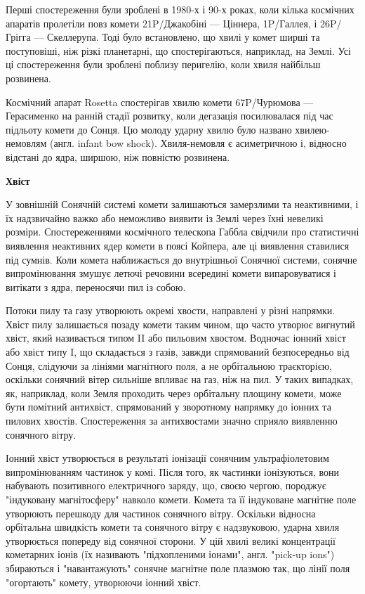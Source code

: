 \documentclass[a4paper]{article}
\begin{document}
    Перші спостереження були зроблені в 1980-х і 90-х роках, коли кілька космічних апаратів пролетіли повз комети 21P/Джакобіні --- Ціннера, 1P/Галлея, і 26P/Грігга --- Скеллерупа. Тоді було встановлено, що хвилі у комет ширші та поступовіші, ніж різкі планетарні, що спостерігаються, наприклад, на Землі. Усі ці спостереження були зроблені поблизу перигелію, коли хвиля найбільш розвинена.
    
    Космічний апарат Rosetta спостерігав хвилю комети 67P/Чурюмова --- Герасименко на ранній стадії розвитку, коли дегазація посилювалася під час підльоту комети до Сонця. Цю молоду ударну хвилю було названо хвилею-немовлям (англ. infant bow shock). Хвиля-немовля є асиметричною і, відносно відстані до ядра, ширшою, ніж повністю розвинена.
    
    \textbf{Хвіст}
    
    У зовнішній Сонячній системі комети залишаються замерзлими та неактивними, і їх надзвичайно важко або неможливо виявити із Землі через їхні невеликі розміри. Спостереженнями космічного телескопа Габбла свідчили про статистичні виявлення неактивних ядер комети в поясі Койпера, але ці виявлення ставилися під сумнів. Коли комета наближається до внутрішньої Сонячної системи, сонячне випромінювання змушує летючі речовини всередині комети випаровуватися і витікати з ядра, переносячи пил із собою.
    
    Потоки пилу та газу утворюють окремі хвости, направлені у різні напрямки. Хвіст пилу залишається позаду комети таким чином, що часто утворює вигнутий хвіст, який називається типом II або пильовим хвостом. Водночас іонний хвіст або хвіст типу I, що складається з газів, завжди спрямований безпосередньо від Сонця, слідуючи за лініями магнітного поля, а не орбітальною траєкторією, оскільки сонячний вітер сильніше впливає на газ, ніж на пил. У таких випадках, як, наприклад, коли Земля проходить через орбітальну площину комети, може бути помітний антихвіст, спрямований у зворотному напрямку до іонних та пилових хвостів. Спостереження за антихвостами значно сприяло виявленню сонячного вітру.
    
    Іонний хвіст утворюється в результаті іонізації сонячним ультрафіолетовим випромінюванням частинок у комі. Після того, як частинки іонізуються, вони набувають позитивного електричного заряду, що, своєю чергою, породжує "індуковану магнітосферу" навколо комети. Комета та її індуковане магнітне поле утворюють перешкоду для частинок сонячного вітру. Оскільки відносна орбітальна швидкість комети та сонячного вітру є надзвуковою, ударна хвиля утворюється попереду від сонячної сторони. У цій хвилі великі концентрації кометарних іонів (їх називають "підхопленими іонами", англ. "pick-up ions") збираються і "навантажують" сонячне магнітне поле плазмою так, що лінії поля "огортають" комету, утворюючи іонний хвіст.
    
\end{document}
